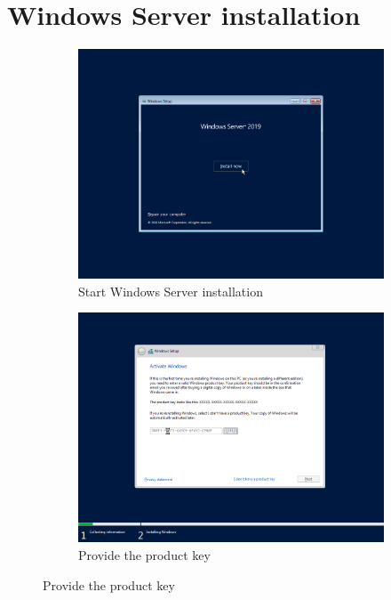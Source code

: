 \section{Windows Server installation}
\begin{figure}[!htb]
	\begin{subfigure}{0.5\textwidth}
		\captionsetup{width=0.8\linewidth}
		\includegraphics[width=0.9\linewidth]{img/Methodologie/Migration4.png}
		\centering
		\caption{Start Windows Server installation}
	\end{subfigure}
	\begin{subfigure}{0.5\textwidth}
		\captionsetup{width=0.8\linewidth}
		\includegraphics[width=0.9\linewidth]{img/Methodologie/Migration5.png} 
		\centering
		\caption{Provide the product key}
	\end{subfigure}
\end{figure}
